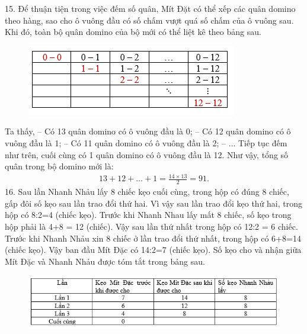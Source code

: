 \vskip 0.1cm
15.
Để thuận tiện trong việc đếm số quân, Mít Đặt có thể xếp các quân domino theo hàng, sao cho ô vuông đầu có số chấm vượt quá số chấm của ô vuông sau. Khi đó, toàn bộ quân domino của bộ mới có thể liệt kê theo bảng sau.
\begin{figure}[H]
	\centering
	\vspace*{-5pt}
	\captionsetup{labelformat= empty, justification=centering}
	\includegraphics[width=0.9\linewidth]{11}
	\vspace*{-15pt}
\end{figure}
Ta thấy,
\vskip 0.1cm
-- Có 13 quân domino có ô vuông đầu là 0;
\vskip 0.1cm
-- Có 12 quân domino có ô vuông đầu là 1;
\vskip 0.1cm
-- Có 11 quân domino có ô vuông đầu là 2;
\vskip 0.1cm
-- $\ldots$
\vskip 0.1cm
Tiếp tục đếm như trên, cuối cùng có 1 quân domino có ô vuông đầu là 12.
\vskip 0.1cm
Như vậy, tổng số quân trong bộ domino mới là:
\begin{align*}
	13 + 12 + \ldots + 1 = \frac{14\times13}{2}=91.
\end{align*}
16.
Sau lần Nhanh Nhảu lấy 8 chiếc kẹo cuối cùng, trong hộp có đúng 8 chiếc, gấp đôi số kẹo sau lần trao đổi thứ hai. Vì vậy sau lần trao đổi kẹo thứ hai, trong hộp có 8:2=4 (chiếc kẹo). Trước khi Nhanh Nhau lấy mất 8 chiếc, số kẹo trong hộp phải là 4+8 = 12 (chiếc). Vậy sau lần
thứ nhất trong hộp có 12:2 = 6 chiếc. Trước khi Nhanh Nhảu xin 8 chiếc ở lần trao đổi thứ nhất, trong hộp có 6+8=14 (chiếc kẹo). Vậy ban đầu Mít Đặc có 14:2=7 (chiếc kẹo).
\vskip 0.1cm
Số kẹo cho và nhận giữa Mít Đặc và Nhanh Nhảu được tóm tắt trong bảng sau.
\begin{figure}[H]
	\centering
	\vspace*{-5pt}
	\captionsetup{labelformat= empty, justification=centering}
	\includegraphics[width=1\linewidth]{12}
	\vspace*{-15pt}
\end{figure}
